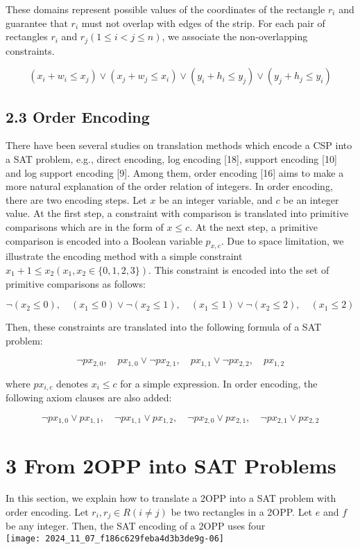 \documentclass[10pt]{article}
\begin{document}
These domains represent possible values of the coordinates of the rectangle $r_{i}$ and guarantee that $r_{i}$ must not overlap with edges of the strip. For each pair of rectangles $r_{i}$ and $r_{j}(1 \leq i<j \leq n)$, we associate the non-overlapping constraints.


\begin{equation*}
\left(x_{i}+w_{i} \leq x_{j}\right) \vee\left(x_{j}+w_{j} \leq x_{i}\right) \vee\left(y_{i}+h_{i} \leq y_{j}\right) \vee\left(y_{j}+h_{j} \leq y_{i}\right) \tag{2}
\end{equation*}


\subsection*{2.3 Order Encoding}
There have been several studies on translation methods which encode a CSP into a SAT problem, e.g., direct encoding, log encoding [18], support encoding [10] and log support encoding [9]. Among them, order encoding [16] aims to make a more natural explanation of the order relation of integers. In order encoding, there are two encoding steps. Let $x$ be an integer variable, and $c$ be an integer value. At the first step, a constraint with comparison is translated into primitive comparisons which are in the form of $x \leq c$. At the next step, a primitive comparison is encoded into a Boolean variable $p_{x, c}$. Due to space limitation, we illustrate the encoding method with a simple constraint $x_{1}+1 \leq x_{2}\left(x_{1}, x_{2} \in\{0,1,2,3\}\right)$. This constraint is encoded into the set of primitive comparisons as follows:

$$
\neg\left(x_{2} \leq 0\right), \quad\left(x_{1} \leq 0\right) \vee \neg\left(x_{2} \leq 1\right), \quad\left(x_{1} \leq 1\right) \vee \neg\left(x_{2} \leq 2\right), \quad\left(x_{1} \leq 2\right)
$$

Then, these constraints are translated into the following formula of a SAT problem:

$$
\neg p x_{2,0}, \quad p x_{1,0} \vee \neg p x_{2,1}, \quad p x_{1,1} \vee \neg p x_{2,2}, \quad p x_{1,2}
$$

where $p x_{i, c}$ denotes $x_{i} \leq c$ for a simple expression. In order encoding, the following axiom clauses are also added:

$$
\neg p x_{1,0} \vee p x_{1,1}, \quad \neg p x_{1,1} \vee p x_{1,2}, \quad \neg p x_{2,0} \vee p x_{2,1}, \quad \neg p x_{2,1} \vee p x_{2,2}
$$

\section*{3 From 2OPP into SAT Problems}
In this section, we explain how to translate a 2OPP into a SAT problem with order encoding. Let $r_{i}, r_{j} \in R(i \neq j)$ be two rectangles in a 2OPP. Let $e$ and $f$ be any integer. Then, the SAT encoding of a 2OPP uses four\\
\texttt{[image: 2024\_11\_07\_f186c629feba4d3b3de9g-06]}
\end{document}
